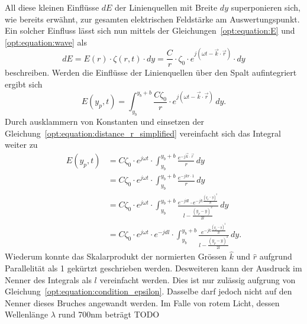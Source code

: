 All diese kleinen Einflüsse $dE$ der Linienquellen mit Breite $dy$ superponieren sich, wie bereits erwähnt, zur gesamten elektrischen Feldstärke am Auswertungspunkt.
Ein solcher Einfluss lässt sich nun mittels der Gleichungen~\ref{opt:equation:E} und \ref{opt:equation:wave} als
\begin{equation}
dE
=
E(r) \cdot \zeta(r, t) \cdot dy
=
\frac{C}{r} \cdot \zeta_0 \cdot e^{j(\omega t - \vec{k}\cdot\vec{r})} \cdot dy
\end{equation}
beschreiben.
Werden die Einflüsse der Linienquellen über den Spalt aufintegriert ergibt sich
\begin{equation}
E(y_p, t)
=
\int_{y_b}^{y_b+b}\frac{C\zeta_0}{r} \cdot e^{j(\omega t - \vec{k}\cdot\vec{r})} \,dy
.
\label{opt:equation:integral_basic}
\end{equation}
Durch ausklammern von Konstanten und einsetzen der Gleichung~\ref{opt:equation:distance_r_simplified} vereinfacht sich das Integral weiter zu
\begin{align}
E(y_p, t)
&=
C\zeta_0 \cdot e^{j\omega t} \cdot \int_{y_b}^{y_b+b} \frac{e^{-j\vec{k}\cdot\vec{r}}}{r} \,dy
\\
&=
C\zeta_0 \cdot e^{j\omega t} \cdot \int_{y_b}^{y_b+b} \frac{e^{-jkr \cdot 1}}{r} \,dy
\\
&=
C\zeta_0 \cdot e^{j\omega t} \cdot \int_{y_b}^{y_b+b} \frac{e^{-jdl} \cdot e^{-jk\frac{(y_p-y)^2}{2l}}}{l - \frac{(y_p-y)^2}{2l}} \,dy
\\
&=
C\zeta_0 \cdot e^{j\omega t} \cdot e^{-jdl} \cdot \int_{y_b}^{y_b+b}\frac{e^{-jk\frac{(y_p-y)^2}{2l}}}{l - \frac{(y_p-y)^2}{2l}} \,dy
.
\end{align}
Wiederum konnte das Skalarprodukt der normierten Grössen $\hat{k}$ und $\hat{r}$ aufgrund Parallelität als 1 gekürtzt geschrieben werden.
Desweiteren kann der Ausdruck im Nenner des Integrals als $l$ vereinfacht werden.
Dies ist nur zulässig aufgrung von Gleichung~\ref{opt:equation:condition_epsilon}.
Dasselbe darf jedoch nicht auf den Nenner dieses Bruches angewandt werden.
Im Falle von rotem Licht, dessen Wellenlänge $\lambda$ rund 700nm beträgt TODO
